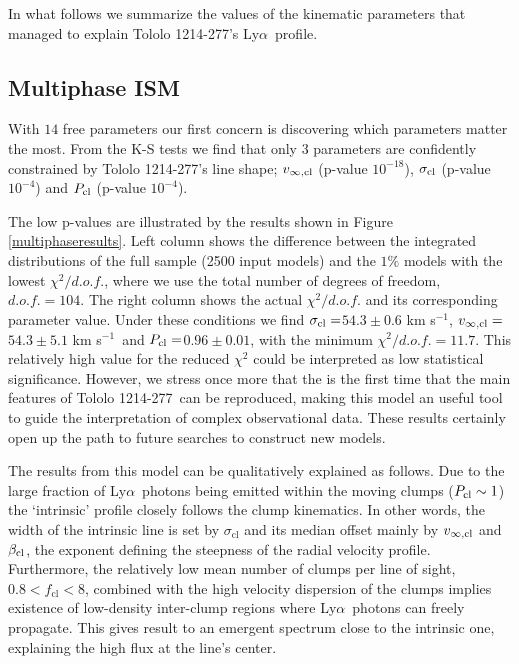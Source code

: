 \documentclass[a4paper,fleqn,usenatbib]{mnras}
\newcommand{\tol}{Tololo 1214-277}
\newcommand{\lya}{\ifmmode{{\rm Ly}\alpha}\else Ly$\alpha$\ \fi}
\newcommand{\sigmaclump}{$54.3\pm 0.6$ km s$^{-1}$}
\newcommand{\inftyclump}{$54.3\pm 5.1$ km s$^{-1}$}
\newcommand{\probaclump}{$0.96\pm 0.01$}
\begin{document}
In what follows we summarize the values of the kinematic parameters
that managed to explain \tol's \lya profile.


\subsection{Multiphase ISM}

With $14$ free parameters our first concern is discovering which 
parameters matter the most.
From the K-S tests we find that only 3 parameters 
are confidently constrained by \tol's line shape;
$v_{\infty,\rm{cl}}$ (p-value  $10^{-18}$), $\sigma_{\rm cl}$ (p-value
$10^{-4}$) and $P_{\rm cl}$ (p-value $10^{-4}$). 

The low p-values are illustrated by the results shown in Figure \ref{multiphaseresults}.
Left column shows the difference between the integrated distributions
of the full sample (2500 input models) and the $1\%$ models with the lowest
$\chi^2/d.o.f.$, where we use the total number of degrees of freedom,
$d.o.f.=104$. 
The right column shows the actual $\chi^2/d.o.f.$ 
and its corresponding parameter value. 
Under these conditions we find $\sigma_{\rm cl}=$\sigmaclump,
$v_{\infty {\rm, cl}}=$\inftyclump\ and $P_{\rm cl}=$\probaclump, 
  with the minimum $\chi^2/d.o.f.=11.7$. This relatively high value
    for the reduced $\chi^2$ could be interpreted as low statistical
    significance. 
However, we stress once more that the is the first time that the main
features of \tol\ can be reproduced, making this model an useful tool
to guide the interpretation of complex observational data. 
These results certainly open up the path to future searches to
construct new models.

The results from this model can be qualitatively explained as follows.
Due to the large fraction of \lya photons being emitted within the
moving clumps ($P_{\rm cl}\sim 1$) the `intrinsic' profile closely follows 
the clump kinematics. 
In other words, the width of the intrinsic line
is set by $\sigma_{\mathrm{cl}}$ and its median offset mainly by
$v_{\infty,{\rm cl}}$ and $\beta_{\rm cl}$, the exponent defining
  the steepness of the radial velocity profile. 
Furthermore, the relatively low mean number of clumps per line of
sight, $0.8<f_{\mathrm{cl}}<8$, combined with the high velocity dispersion
of the clumps implies existence of low-density inter-clump 
regions where \lya photons can freely propagate.
This gives result to an emergent spectrum close to the intrinsic one,
explaining the high flux at the line's center.    
\end{document}
